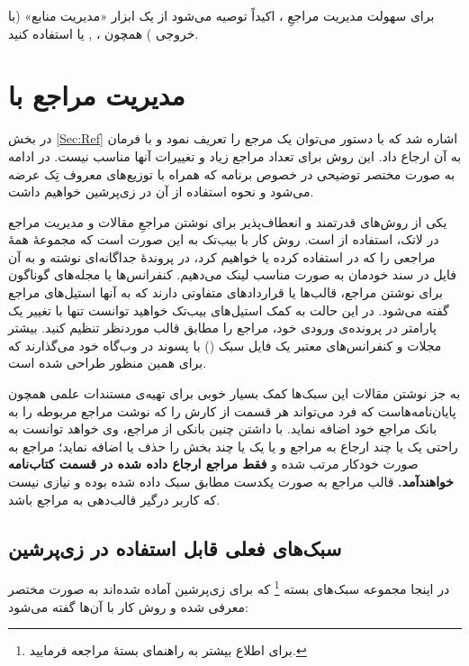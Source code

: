 برای سهولت مدیریت مراجعِ \پ%
، اکیداً توصیه می‌شود از یک ابزار «مدیریت منابع» (با خروجی
\texorpdfstring{}{Bib\TeX}%
) همچون
،
,
یا
استفاده کنید.

\section{ مدیریت مراجع با  \texorpdfstring{}{Bib\TeX} }
در بخش \ref{Sec:Ref} اشاره شد که با دستور 
  می‌توان یک مرجع را تعریف نمود و با فرمان
  به آن ارجاع داد. این روش برای تعداد مراجع زیاد و تغییرات آنها مناسب نیست. در ادامه به صورت مختصر توضیحی در خصوص برنامه  که همراه با توزیع‌های معروف تِک عرضه می‌شود و نحوه استفاده از آن در زی‌پرشین خواهیم داشت.

یکی از روش‌های قدرتمند و انعطاف‌پذیر برای نوشتن مراجعِ مقالات و مدیریت مراجع در لاتک، استفاده از   است.
 روش کار با بیب‌تک به این صورت است که مجموعهٔ همهٔ مراجعی را که در \پ استفاده کرده یا خواهیم کرد، 
در پروندهٔ جداگانه‌ای نوشته و به آن فایل در سند خودمان به صورت مناسب لینک می‌دهیم.
 کنفرانس‌ها یا مجله‌های گوناگون برای نوشتن مراجع، قالب‌ها یا قراردادهای متفاوتی دارند که به آنها استیل‌های مراجع گفته می‌شود.
 در این حالت به کمک ‌استیل‌های بیب‌تک خواهید توانست تنها با تغییر یک پارامتر در پرونده‌ی ورودی خود، مراجع را مطابق قالب موردنظر تنظیم کنید. 
 بیشتر مجلات و کنفرانس‌های معتبر یک فایل سبک
 ()
با پسوند  در وب‌گاه خود می‌گذارند که برای همین منظور طراحی شده است.

به جز نوشتن مقالات این سبک‌ها کمک بسیار خوبی برای تهیه‌ی مستندات علمی همچون پایان‌نامه‌هاست که فرد می‌تواند هر قسمت از کارش را که نوشت مراجع مربوطه را به بانک مراجع خود اضافه نماید. با داشتن چنین بانکی از مراجع، وی خواهد توانست به راحتی یک یا چند ارجاع به مراجع و یا یک یا چند بخش را حذف یا اضافه ‌نماید؛ 
مراجع به صورت خودکار مرتب شده و
\textbf{فقط مراجع ارجاع داده شده در قسمت کتاب‌نامه خواهندآمد.}
قالب مراجع به صورت یکدست مطابق سبک داده شده بوده و نیازی نیست که کاربر درگیر قالب‌دهی به مراجع باشد. 

\subsection{سبک‌های فعلی قابل استفاده در زی‌پرشین}
در اینجا مجموعه‌ سبک‌های بسته
%
\footnote{ برای اطلاع بیشتر به راهنمای بستهٔ
مراجعه فرمایید.}
که برای  زی‌پرشین آماده شده‌اند به صورت مختصر معرفی شده و روش کار با آن‌ها گفته می‌شود:

